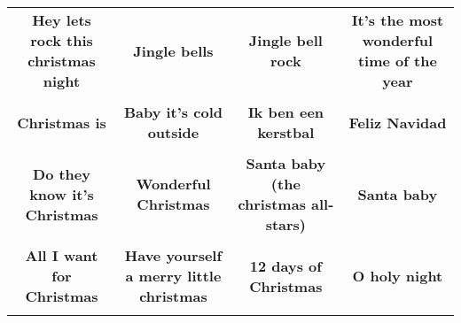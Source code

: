 \documentclass[12pt]{article} \usepackage{eso-pic, graphicx}
\newcommand{\background}[1]{%
\AddToShipoutPictureBG*{\texttt{[image: \#1]}}
}
\begin{document}
\tabcolsep=30.2pt \renewcommand{\arraystretch}{4.5}   \vspace*{4.3cm} \begin{center}  \begin{tabular}{c c c c}
\parbox{3cm}{\centering \textbf{Hey lets rock this christmas night}}& 
\parbox{3cm}{\centering \textbf{Jingle bells}}& 
\parbox{3cm}{\centering \textbf{Jingle bell rock}}& 
\parbox{3cm}{\centering \textbf{It’s the most wonderful time of the year}}\\ \\ 
\parbox{3cm}{\centering \textbf{Christmas is}}& 
\parbox{3cm}{\centering \textbf{Baby it’s cold outside}}& 
\parbox{3cm}{\centering \textbf{Ik ben een kerstbal}}& 
\parbox{3cm}{\centering \textbf{Feliz Navidad}}\\ \\ 
\parbox{3cm}{\centering \textbf{Do they know it's Christmas}}& 
\parbox{3cm}{\centering \textbf{Wonderful Christmas}}& 
\parbox{3cm}{\centering \textbf{Santa baby (the christmas all-stars)}}& 
\parbox{3cm}{\centering \textbf{Santa baby}}\\ \\ 
\parbox{3cm}{\centering \textbf{All I want for Christmas}}& 
\parbox{3cm}{\centering \textbf{Have yourself a merry little christmas}}& 
\parbox{3cm}{\centering \textbf{12 days of Christmas}}& 
\parbox{3cm}{\centering \textbf{O holy night}}\\ \\ 
\end{tabular} \background{discobingo.pdf} \end{center} 
\end{document}
